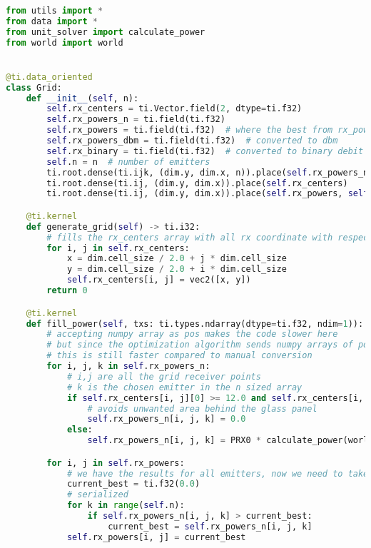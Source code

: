 \begin{lstlisting}[language=python]
from utils import *
from data import *
from unit_solver import calculate_power
from world import world


@ti.data_oriented
class Grid:
    def __init__(self, n):
        self.rx_centers = ti.Vector.field(2, dtype=ti.f32)
        self.rx_powers_n = ti.field(ti.f32)
        self.rx_powers = ti.field(ti.f32)  # where the best from rx_powers_n is extracted
        self.rx_powers_dbm = ti.field(ti.f32)  # converted to dbm
        self.rx_binary = ti.field(ti.f32)  # converted to binary debit
        self.n = n  # number of emitters
        ti.root.dense(ti.ijk, (dim.y, dim.x, n)).place(self.rx_powers_n)
        ti.root.dense(ti.ij, (dim.y, dim.x)).place(self.rx_centers)
        ti.root.dense(ti.ij, (dim.y, dim.x)).place(self.rx_powers, self.rx_powers_dbm, self.rx_binary)  # AoS

    @ti.kernel
    def generate_grid(self) -> ti.i32:
        # fills the rx_centers array with all rx coordinate with respect to cell size
        for i, j in self.rx_centers:
            x = dim.cell_size / 2.0 + j * dim.cell_size
            y = dim.cell_size / 2.0 + i * dim.cell_size
            self.rx_centers[i, j] = vec2([x, y])
        return 0

    @ti.kernel
    def fill_power(self, txs: ti.types.ndarray(dtype=ti.f32, ndim=1)):
        # accepting numpy array as pos makes the code slower here
        # but since the optimization algorithm sends numpy arrays of positions
        # this is still faster compared to manual conversion
        for i, j, k in self.rx_powers_n:
            # i,j are all the grid receiver points
            # k is the chosen emitter in the n sized array
            if self.rx_centers[i, j][0] >= 12.0 and self.rx_centers[i, j][1] <= (4.0 / 3.0 * (self.rx_centers[i, j][0] - 12.0)):
                # avoids unwanted area behind the glass panel
                self.rx_powers_n[i, j, k] = 0.0
            else:
                self.rx_powers_n[i, j, k] = PRX0 * calculate_power(world, vec2([txs[2*k], txs[2*k+1]]), self.rx_centers[i, j])

        for i, j in self.rx_powers:
            # we have the results for all emitters, now we need to take the best ones
            current_best = ti.f32(0.0)
            # serialized
            for k in range(self.n):
                if self.rx_powers_n[i, j, k] > current_best:
                    current_best = self.rx_powers_n[i, j, k]
            self.rx_powers[i, j] = current_best


\end{lstlisting}
